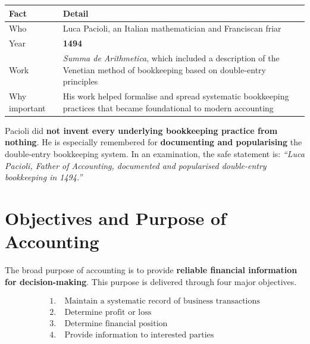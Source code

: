 \documentclass[11pt,a4paper]{article}
\begin{document}
\begin{center}
\small
\begin{tabularx}{\textwidth}{@{}l Y@{}}
\toprule
{}\textbf{Fact} & \textbf{Detail}\\
\midrule
Who & Luca Pacioli, an Italian mathematician and Franciscan friar\\
Year & \textbf{1494}\\
Work & \emph{Summa de Arithmetica}, which included a description of the Venetian method of bookkeeping based on double-entry principles\\
Why important & His work helped formalise and spread systematic bookkeeping practices that became foundational to modern accounting\\
\bottomrule
\end{tabularx}
\end{center}

\begin{impbox}
Pacioli did \textbf{not invent every underlying bookkeeping practice from nothing}. He is
especially remembered for \textbf{documenting and popularising} the double-entry bookkeeping
system. In an examination, the safe statement is: \emph{``Luca Pacioli, Father of Accounting,
documented and popularised double-entry bookkeeping in 1494.''}
\end{impbox}

\section{Objectives and Purpose of Accounting}

The broad purpose of accounting is to provide \textbf{reliable financial information for
decision-making}. This purpose is delivered through four major objectives.

\begin{keybox}
\[
\boxed{
\begin{aligned}
1.&\ \text{Maintain a systematic record of business transactions}\\
2.&\ \text{Determine profit or loss}\\
3.&\ \text{Determine financial position}\\
4.&\ \text{Provide information to interested parties}
\end{aligned}}
\]
\end{keybox}
\end{document}
